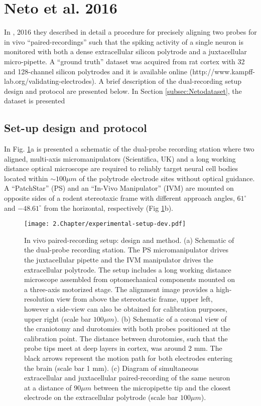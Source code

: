 
\section{Neto et al. 2016}
\label{sec:exp-setup}
In \cite{Netoetal}, 2016 they described in detail a procedure for precisely aligning two probes for in vivo “paired-recordings” such that the spiking activity of a single neuron is monitored with both a dense extracellular silicon polytrode and a juxtacellular micro-pipette. A “ground truth” dataset was acquired from rat cortex with 32 and 128-channel silicon polytrodes and it is available online (http://www.kampff-lab.org/validating-electrodes). A brief description of the dual-recording setup design and protocol are presented below. In Section \ref{subsec:Netodataset}, the dataset is presented

\subsection{Set-up design and protocol}
\label{subsec:setup-and-protocol}
In Fig. \ref{fig:experimental-aparatus}a is presented a schematic of the dual-probe recording station where two aligned, multi-axis micromanipulators (Scientifica, UK) and a long working distance optical microscope are required to reliably target neural cell bodies located within $\sim 100 \mu m$ of the polytrode electrode sites without optical guidance. A “PatchStar” (PS) and an “In-Vivo Manipulator” (IVM) are mounted on opposite sides of a rodent stereotaxic frame with different approach angles, $61^{\circ}$  and $-48.61^{\circ}$  from the horizontal, respectively (Fig \ref{fig:experimental-aparatus}b). 

\begin{figure}[htb]
	\centering
	\texttt{[image: 2.Chapter/experimental-setup-dev.pdf]}
	\caption{In vivo paired-recording setup: design and method.
(a) Schematic of the dual-probe recording station. The PS micromanipulator drives the juxtacellular pipette and the IVM manipulator drives the extracellular polytrode. The setup includes a long working distance microscope assembled from optomechanical components mounted on a three-axis motorized stage. The alignment image provides a high-resolution view from above the stereotactic frame, upper left, however a side-view can also be obtained for calibration purposes, upper right (scale bar $100 \mu m$).  (b) Schematic of a coronal view of the craniotomy and durotomies with both probes positioned at the calibration point. The distance between durotomies, such that the probe tips meet at deep layers in cortex, was around 2 mm. The black arrows represent the motion path for both electrodes entering the brain (scale bar 1 mm). (c) Diagram of simultaneous extracellular and juxtacellular paired-recording of the same neuron at a distance of $90 \mu m$ between the micropipette tip and the closest electrode on the extracellular polytrode (scale bar $100 \mu m$).}
\label{fig:experimental-aparatus}
\end{figure}

